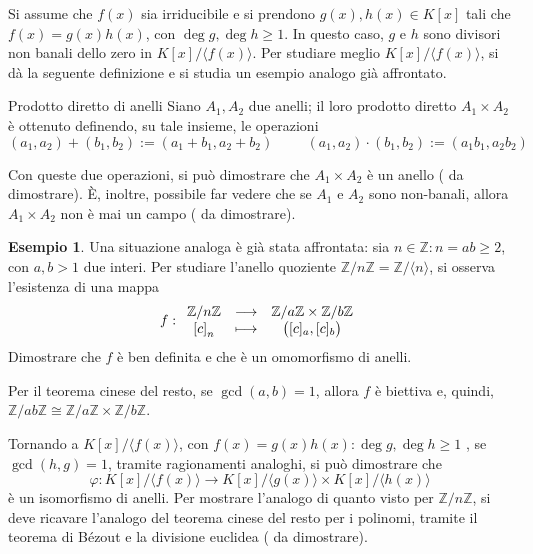 \documentclass[11pt, a4paper]{scrartcl}
\theoremstyle{definition}
\newtheorem{esempio}{Esempio}
\numberwithin{esempio}{section}
\theoremstyle{definition}
\numberwithin{obs}{section}
\numberwithin{nota}{section}
\numberwithin{equation}{subsection}
\begin{document}
Si assume che $f(x)$ sia irriducibile e si prendono $g(x), h(x) \in K[x]$ tali che $f(x) = g(x) h(x)$, con $\operatorname{deg} g, \operatorname{deg} h \ge  1$.
In questo caso, $g$ e $h$ sono divisori non banali dello zero in $K[x] / \langle f(x) \rangle$.
Per studiare meglio $K[x] / \langle f(x) \rangle$, si d\`a la seguente definizione e si studia un esempio analogo gi\`a affrontato.
\begin{definizione}
	{Prodotto diretto di anelli}{}
	Siano $A_1,A_2$ due anelli; il loro prodotto diretto $A_1 \times  A_2$ \`e ottenuto definendo, su tale insieme, le operazioni
	\[
		(a_1,a_2) + (b_1, b_2) := (a_1+ b_1, a_2+b_2) \hspace{1cm} (a_1,a_2) \cdot (b_1,b_2) := (a_1b_1, a_2b_2)
	\] 
	
\end{definizione}
\noindent Con queste due operazioni, si pu\`o dimostrare che $A_1 \times A_2 $ \`e un anello ({\color{red} da dimostrare}).
\`E, inoltre, possibile far vedere che se $A_1$ e $A_2$ sono non-banali, allora $A_1 \times A_2$ non \`e mai un campo ({\color{red} da dimostrare}).
\begin{esempio}
Una situazione analoga \`e gi\`a stata affrontata: sia $n \in \mathbb{Z} : n = ab\ge 2$, con $a,b > 1$ due interi. 
Per studiare l'anello quoziente $\mathbb{Z} / n \mathbb{Z} = \mathbb{Z}/\langle n \rangle$, si osserva l'esistenza di una mappa
\[
f: 
\begin{array}{c c c}
	\mathbb{Z} / n\mathbb{Z} & \longrightarrow & \mathbb{Z}/a \mathbb{Z} \times  \mathbb{Z} / b \mathbb{Z}\\
	\left[ c \right] _n & \longmapsto & \big([c]_a , [c]_b\big) 
\end{array}
\] 
{\color{red} Dimostrare che $f$ \`e ben definita e che \`e un omomorfismo di anelli}. 

Per il teorema cinese del resto, se $\operatorname{gcd}(a,b) =1$, allora $f$ \`e biettiva e, quindi, $\mathbb{Z} / ab \mathbb{Z} \cong \mathbb{Z} / a \mathbb{Z} \times  \mathbb{Z} / b \mathbb{Z}$.
\end{esempio}
\noindent Tornando a $K[x] / \langle f(x) \rangle$, con $f(x) = g(x) h(x) : \operatorname{deg} g ,\operatorname{deg} h	\ge 1$ , se $\operatorname{gcd}(h,g) =1$, tramite ragionamenti analoghi, si pu\`o dimostrare che
\begin{equation}
	\varphi : K[x] / \langle f(x) \rangle \longrightarrow K[x] / \langle g(x) \rangle\times K [x] / \langle h(x) \rangle
\end{equation}
\`e un isomorfismo di anelli.
Per mostrare l'analogo di quanto visto per $\mathbb{Z} / n \mathbb{Z}$, si deve ricavare l'analogo del teorema cinese del resto per i polinomi, tramite il teorema di B\'ezout e la divisione euclidea ({\color{red} da dimostrare}).
\end{document}

